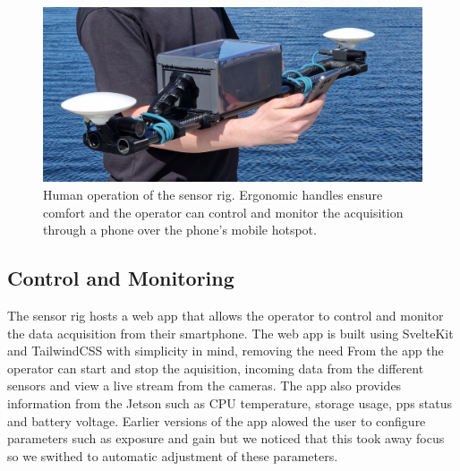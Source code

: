 \begin{figure}[H]
    \centering
    \includegraphics[width=\textwidth]{figures/operation.jpg}
    \caption{Human operation of the sensor rig. Ergonomic handles ensure comfort and the operator can control and monitor the acquisition through a phone over the phone's mobile hotspot.}
\end{figure}

\subsection{Control and Monitoring}
The sensor rig hosts a web app that allows the operator to control and monitor the data acquisition from their smartphone.
The web app is built using SvelteKit and TailwindCSS with simplicity in mind, removing the need
From the app the operator can start and stop the aquisition, incoming data from the different sensors and view a live stream from the cameras.
The app also provides information from the Jetson such as CPU temperature, storage usage, \gls{pps} status and battery voltage.
Earlier versions of the app alowed the user to configure parameters such as exposure and gain but we noticed that this took away focus so we swithed to automatic adjustment of these parameters.

